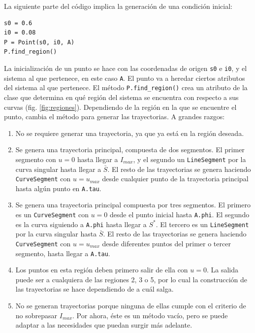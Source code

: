 \documentclass{article}
\begin{document}
La siguiente parte del código implica la generación de una condición inicial:
\begin{lstlisting}[basicstyle = \ttfamily]
s0 = 0.6
i0 = 0.08
P = Point(s0, i0, A)
P.find_region()
\end{lstlisting}
La inicialización de un punto se hace con las coordenadas de origen \texttt{s0} e \texttt{i0}, y el sistema al que pertenece, en este caso \texttt{A}. El punto va a heredar ciertos atributos del sistema al que pertenece. El método \texttt{P.find\_region()} crea un atributo de la clase que determina en qué región del sistema se encuentra con respecto a sus curvas (fig. \ref{fig:regiones}). Dependiendo de la región en la que se encuentre el punto, cambia el método para generar las trayectorias. A grandes razgos:
\begin{enumerate}
\item No se requiere generar una trayectoria, ya que ya está en la región deseada.

\item Se genera una trayectoria principal, compuesta de dos segmentos. El primer segmento con $u = 0$ hasta llegar a $I_{max}$, y el segundo un \texttt{LineSegment} por la curva singular hasta llegar a $\bar{S}$. El resto de las trayectorias se genera haciendo \texttt{CurveSegment} con $u = u_{max}$ desde cualquier punto de la trayectoria principal hasta algún punto en \texttt{A.tau}.

\item Se genera una trayectoria principal compuesta por tres segmentos. El primero es un \texttt{CurveSegment} con $u = 0$ desde el punto inicial hasta \texttt{A.phi}. El segundo es la curva siguiendo a \texttt{A.phi} hasta llegar a $S^*$. El tercero es un \texttt{LineSegment} por la curva singular hasta $\bar{S}$. El resto de las trayectorias se genera haciendo \texttt{CurveSegment} con $u = u_{max}$ desde diferentes puntos del primer o tercer segmento, hasta llegar a \texttt{A.tau}.

\item Los puntos en esta región deben primero salir de ella con $u = 0$. La salida puede ser a cualquiera de las regiones 2, 3 o 5, por lo cual la construcción de las trayectorias se hace dependiendo de a cuál salga.

\item No se generan trayectorias porque ninguna de ellas cumple con el criterio de no sobrepasar $I_{max}$. Por ahora, éste es un método vacío, pero se puede adaptar a las necesidades que puedan surgir más adelante.
\end{enumerate}
\end{document}
